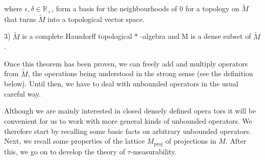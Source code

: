 where $\epsilon,\delta\in \mathbb{R}_+$, form a basis for the neighbourhoods of $0$ for a topology on $\widetilde{M}$ that turns $\widetilde{M}$ into a topological vector space. \par
3) $\widetilde{M}$ is a complete Hausdorff topological * -algebra and M is a dense subset of $\widetilde{M}$.\par
\bigskip
Once this theorem has been proven, we can freely add and multiply operators from $\widetilde{M}$, the operations being understood in the strong sense (see the definition below). Until then, we have to deal with unbounded operators in the usual careful way.\par
Although we are mainly interested in closed densely defined opera tors it will be convenient for us to work with more general kinds of unbounded operators. We therefore start by recalling some basic facts on arbitrary unbounded operators. Next, we recall some properties of the lattice $M_{\text{proj}}$ of projections in $M$. After this, we go on to develop the theory of $\tau$-measurability.\par
\bigskip
